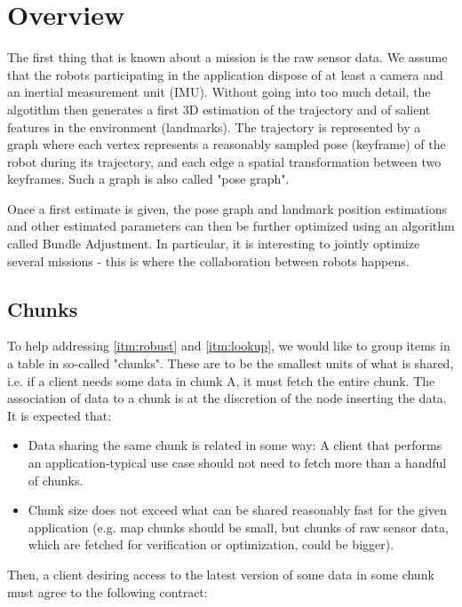 \documentclass{article}
\begin{document}
\section{Overview}

The first thing that is known about a mission is the raw sensor data. We assume
that the robots participating in the application dispose of at least a camera
and an inertial measurement unit (IMU). Without going into too much detail, the
algotithm then generates a first 3D estimation of the trajectory and of salient
features in the environment (landmarks). The trajectory is represented by a
graph where each vertex represents a reasonably sampled pose (keyframe) of the
robot during its trajectory, and each edge a spatial transformation between two 
keyframes. Such a graph is also called "pose graph".

Once a first estimate is given, the pose graph and landmark position estimations
and other estimated parameters can then be further optimized using an algorithm
called Bundle Adjustment. In particular, it is interesting to jointly optimize
several missions - this is where the collaboration between robots happens.

\subsection{Chunks}

To help addressing \ref{itm:robust} and \ref{itm:lookup}, we would like to
group items in a table in so-called "chunks". These are to be the smallest units
of what is shared, i.e. if a client needs some data in chunk A, it must fetch
the entire chunk. The association of data to a chunk
is at the discretion of the node inserting the data. It is expected that:

\begin{itemize}
  \itemsep0em
  \item Data sharing the same chunk is related in some way: A client that
    performs an application-typical use case should not need to fetch more than
    a handful of chunks.
  \item Chunk size does not exceed what can be shared reasonably fast for the
    given application (e.g. map chunks should be small, but chunks of raw
    sensor data, which are fetched for verification or optimization, 
    could be bigger).
\end{itemize}

Then, a client desiring access to the latest version of some data in some chunk
must agree to the following contract:
\end{document}
